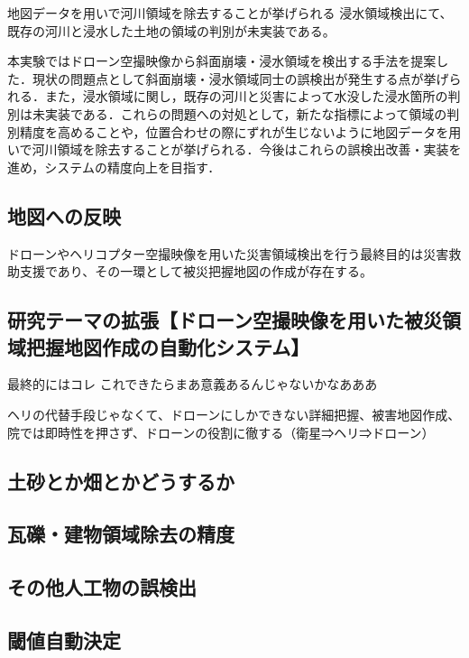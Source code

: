\documentclass[../Thesis]{subfiles}
\begin{document}
	
	
	地図データを用いで河川領域を除去することが挙げられる
	浸水領域検出にて、既存の河川と浸水した土地の領域の判別が未実装である。


	本実験ではドローン空撮映像から斜面崩壊・浸水領域を検出する手法を提案した．現状の問題点として斜面崩壊・浸水領域同士の誤検出が発生する点が挙げられる．また，浸水領域に関し，既存の河川と災害によって水没した浸水箇所の判別は未実装である．これらの問題への対処として，新たな指標によって領域の判別精度を高めることや，位置合わせの際にずれが生じないように地図データを用いで河川領域を除去することが挙げられる．今後はこれらの誤検出改善・実装を進め，システムの精度向上を目指す．

\subsection{地図への反映}
	ドローンやヘリコプター空撮映像を用いた災害領域検出を行う最終目的は災害救助支援であり、その一環として被災把握地図の作成が存在する。

\subsection{研究テーマの拡張【ドローン空撮映像を用いた被災領域把握地図作成の自動化システム】}
	最終的にはコレ
	これできたらまあ意義あるんじゃないかなあああ

	ヘリの代替手段じゃなくて、ドローンにしかできない詳細把握、被害地図作成、院では即時性を押さず、ドローンの役割に徹する（衛星⇒ヘリ⇒ドローン）

\subsection{土砂とか畑とかどうするか}

\subsection{瓦礫・建物領域除去の精度}

\subsection{その他人工物の誤検出}

\subsection{閾値自動決定}
\end{document}
